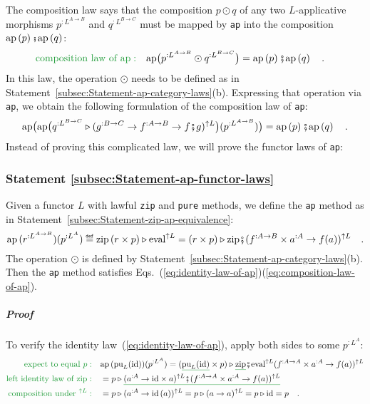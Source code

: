 The composition law says that the composition $p\odot q$ of any two
$L$-applicative morphisms $p^{:L^{A\rightarrow B}}$ and $q^{:L^{B\rightarrow C}}$
must be mapped by \lstinline!ap! into the composition $\text{ap}\left(p\right)\bef\text{ap}\left(q\right)$:
\begin{align}
{\color{greenunder}\text{composition law of }\text{ap}:}\quad & \text{ap}\big(p^{:L^{A\rightarrow B}}\odot q^{:L^{B\rightarrow C}}\big)=\text{ap}\left(p\right)\bef\text{ap}\left(q\right)\quad.\label{eq:composition-law-of-ap}
\end{align}
In this law, the operation $\odot$ needs to be defined as in Statement~\ref{subsec:Statement-ap-category-laws}(b).
Expressing that operation via \lstinline!ap!, we obtain the following
formulation of the composition law of
\lstinline!ap!:
\[
\text{ap}\big(\text{ap}\big(q^{:L^{B\rightarrow C}}\triangleright(g^{:B\rightarrow C}\rightarrow f^{:A\rightarrow B}\rightarrow f\bef g)^{\uparrow L}\big)(p^{:L^{A\rightarrow B}})\big)=\text{ap}\left(p\right)\bef\text{ap}\left(q\right)\quad.
\]
Instead of proving this complicated law, we will prove the functor
laws of \lstinline!ap!:

\subsubsection{Statement \label{subsec:Statement-ap-functor-laws}\ref{subsec:Statement-ap-functor-laws}}

Given a functor $L$ with lawful \lstinline!zip! and \lstinline!pure!
methods, we define the \lstinline!ap! method as in Statement~\ref{subsec:Statement-zip-ap-equivalence}:
\[
\text{ap}\,(r^{:L^{A\rightarrow B}})(p^{:L^{A}})\triangleq\text{zip}\,(r\times p)\triangleright\text{eval}^{\uparrow L}=(r\times p)\triangleright\text{zip}\bef(f^{:A\rightarrow B}\times a^{:A}\rightarrow f(a))^{\uparrow L}\quad.
\]
The operation $\odot$ is defined by Statement~\ref{subsec:Statement-ap-category-laws}(b).
Then the \lstinline!ap! method satisfies Eqs.~(\ref{eq:identity-law-of-ap})\textendash (\ref{eq:composition-law-of-ap}). 

\subparagraph{Proof}

To verify the identity law~(\ref{eq:identity-law-of-ap}), apply
both sides to some $p^{:L^{A}}$:
\begin{align*}
{\color{greenunder}\text{expect to equal }p:}\quad & \text{ap}\,(\text{pu}_{L}(\text{id}))(p^{:L^{A}})=(\gunderline{\text{pu}_{L}(\text{id})}\times p)\triangleright\gunderline{\text{zip}}\bef\text{eval}^{\uparrow L}(f^{:A\rightarrow A}\times a^{:A}\rightarrow f(a))^{\uparrow L}\\
{\color{greenunder}\text{left identity law of }\text{zip}:}\quad & =p\triangleright\gunderline{(a^{:A}\rightarrow\text{id}\times a)^{\uparrow L}\bef(f^{:A\rightarrow A}\times a^{:A}\rightarrow f(a))^{\uparrow L}}\\
{\color{greenunder}\text{composition under }^{\uparrow L}:}\quad & =p\triangleright(a^{:A}\rightarrow\text{id}\,(a))^{\uparrow L}=p\triangleright(a\rightarrow a)^{\uparrow L}=p\triangleright\text{id}=p\quad.
\end{align*}

